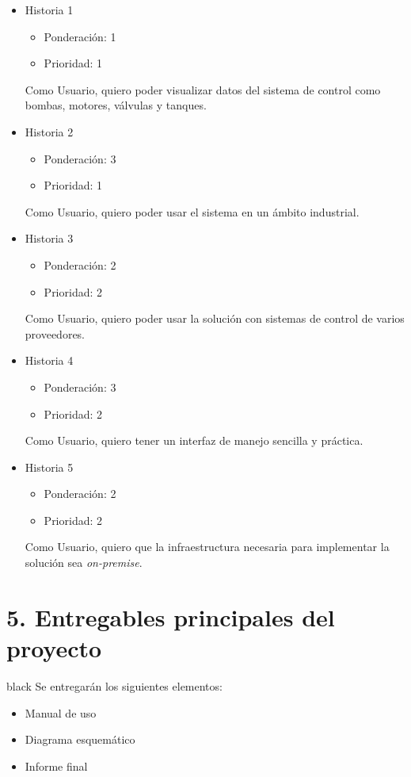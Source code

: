 \documentclass[11pt]{charter}
\begin{document}
\begin{itemize}
\item Historia 1
\begin{itemize}
\item Ponderación: 1
\item Prioridad: 1
\end{itemize}
Como Usuario, quiero poder visualizar datos del sistema de control como bombas, motores, válvulas y tanques.

\item Historia 2
\begin{itemize}
\item Ponderación: 3
\item Prioridad: 1
\end{itemize}
Como Usuario, quiero poder usar el sistema en un ámbito industrial.

\item Historia 3
\begin{itemize}
\item Ponderación: 2
\item Prioridad: 2
\end{itemize}
Como Usuario, quiero poder usar la solución con sistemas de control de varios proveedores.

\item Historia 4 
\begin{itemize}
\item Ponderación: 3
\item Prioridad: 2
\end{itemize}
Como Usuario, quiero tener un interfaz de manejo sencilla y práctica.

\item Historia 5 
\begin{itemize}
\item Ponderación: 2
\item Prioridad: 2
\end{itemize}
Como Usuario, quiero que la infraestructura necesaria para implementar la solución sea \textit{on-premise}.

\end{itemize}


\section{5. Entregables principales del proyecto}
\label{sec:entregables}

\begin{consigna}{black}
Se entregarán los siguientes elementos:
\begin{itemize}
\item Manual de uso
\item Diagrama esquemático
\item Informe final
\end{itemize}

\end{consigna}
\end{document}
